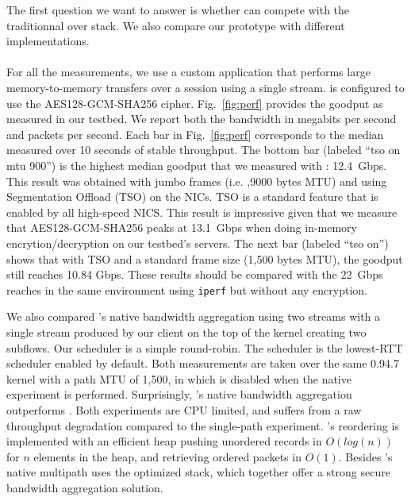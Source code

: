 The first question we want to answer is whether \tcpls can compete with the
traditionnal \tls over \tcp stack. We also compare our \tcpls prototype with
different \quic implementations.

\paragraph*{\tcpls}
For all the \tcpls measurements, we use a custom application that performs
large memory-to-memory transfers over a \tcpls session using a single stream.
\tcpls is configured to use the AES128-GCM-SHA256 cipher. Fig.~\ref{fig:perf} provides the goodput as measured in our testbed. We report both the bandwidth in megabits per second and packets per second. Each bar in Fig.~\ref{fig:perf} corresponds to the median measured over 10 seconds of stable throughput. The bottom bar (labeled ``\tcpls tso on mtu 900'') is the highest median goodput that we measured with \tcpls: 12.4~Gbps. This result was obtained with jumbo frames (i.e. ,9000 bytes MTU) and using \tcp Segmentation Offload (TSO) on the NICs. TSO is a standard feature that is enabled by all high-speed NICS. This result is impressive given that we measure that AES128-GCM-SHA256 peaks at 13.1~Gbps when doing in-memory encrytion/decryption on our testbed's servers.
The next bar (labeled ``\tcpls tso on'') shows that with TSO and a standard frame size (1,500 bytes MTU), the goodput still reaches 10.84 Gbps. These
results should be compared with the 22~Gbps \tcp reaches in the same
environment using \texttt{iperf} but without any encryption.



We also compared \tcpls's native bandwidth aggregation using two streams with a
single stream produced by our \tcpls client on the top of the \mptcp kernel
creating two \mptcp subflows. Our \tcpls scheduler is a simple round-robin. The
\mptcp scheduler is the lowest-RTT scheduler enabled by default. Both
measurements are taken over the same 0.94.7 \mptcp kernel with a path MTU of
1,500, in which \mptcp is disabled when the \tcpls native experiment is
performed.  Surprisingly, \tcpls's native bandwidth aggregation outperforms
\mptcp. Both experiments are CPU limited, and suffers from a raw throughput
degradation compared to the single-path experiment. \tcpls's reordering is
implemented with an efficient heap pushing unordered records in $O(log(n))$ for
$n$ elements in the heap, and retrieving ordered packets in $O(1)$. Besides
\tcpls's native  multipath uses the \tcp optimized stack, which together offer a strong
secure bandwidth aggregation solution.

